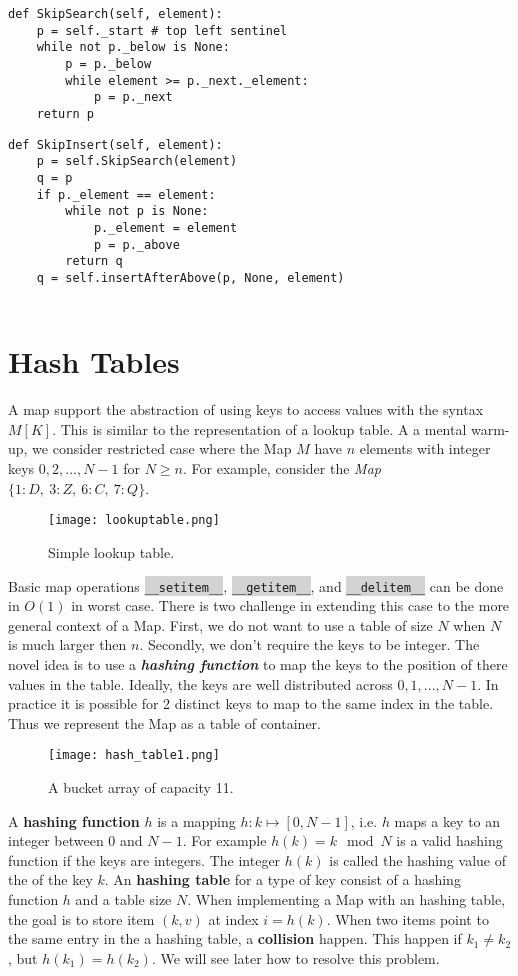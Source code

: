 \documentclass[10pt]{article}
\newcommand{\code}[1]{{\small\colorbox{LightGray}{\texttt{#1}}}}
\begin{document}
\begin{verbatim}
def SkipSearch(self, element):
    p = self._start # top left sentinel
    while not p._below is None:
        p = p._below
        while element >= p._next._element:
            p = p._next
    return p
\end{verbatim}

\begin{verbatim}
def SkipInsert(self, element):
    p = self.SkipSearch(element)
    q = p
    if p._element == element:
        while not p is None:
            p._element = element
            p = p._above
        return q
    q = self.insertAfterAbove(p, None, element)
    
\end{verbatim}

\section{Hash Tables}
A map support the abstraction of using keys to access values with the syntax $M[K]$. This is similar to the representation of a lookup table. A a mental warm-up, we consider restricted case where the Map $M$ have $n$ elements with integer keys $0,2,...,N-1$ for $N\geq n$. For example, consider the \textit{Map} $\{1\colon D,~3\colon Z,~6\colon C,~7\colon Q\}$.
\begin{figure}[h]
	\centering
	\texttt{[image: lookuptable.png]}
	\caption{Simple lookup table.}
\end{figure}
Basic map operations \code{\_\_setitem\_\_}, \code{\_\_getitem\_\_}, and \code{\_\_delitem\_\_} can be done in $O(1)$ in worst case. There is two challenge in extending this case to the more general context of a Map. First, we do not want to use a table of size $N$ when $N$ is much larger then $n$. Secondly, we don't require the keys to be integer. The novel idea is to use a \textbf{\emph{hashing function}} to map the keys to the position of there values in the table. Ideally, the keys are well distributed across $0,1,...,N-1$. In practice it is possible for 2 distinct keys to map to the same index in the table. Thus we represent the Map as a table of container.\\
\begin{figure}[h]
	\centering
	\texttt{[image: hash\_table1.png]}
	\caption{A bucket array of capacity 11.}
\end{figure}

A \textbf{hashing function} $h$ is a mapping $h\colon k \mapsto [0, N-1]$, i.e. $h$ maps a key to an integer between 0 and $N-1$. For example $h(k) = k \mod N$ is a valid hashing function if the keys are integers. The integer $h(k)$ is called the hashing value of the of the key $k$. An \textbf{hashing table} for a type of key consist of a hashing function $h$ and a table size $N$. When implementing a Map with an hashing table, the goal is to store item $(k, v)$ at index $i=h(k)$. When two items point to the same entry in the a hashing table, a \textbf{collision} happen. This happen if $k_1\neq k_2$, but $h(k_1)=h(k_2)$. We will see later how to resolve this problem. \\
\end{document}
